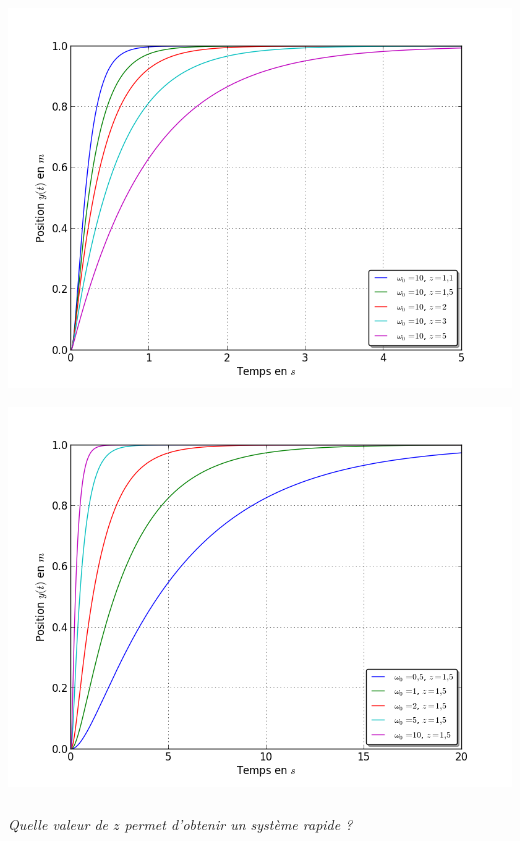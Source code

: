 \documentclass[11pt,oneside]{article}
\begin{document}
{\begin{corrige}
\end{corrige}
\begin{minipage}[c]{.47\linewidth}
\begin{center}
\includegraphics[width=\textwidth]{png/figure_1}
\end{center}
\end{minipage}\hfill
\begin{minipage}[c]{.47\linewidth}
\begin{center}
\includegraphics[width=\textwidth]{png/figure_2}
\end{center}
\end{minipage}
}{}


\subparagraph{}
\textit{Quelle valeur de $z$ permet d'obtenir un système rapide ?}
\end{document}
